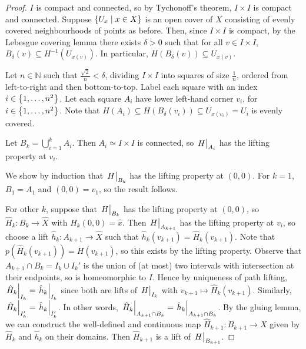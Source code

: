 \begin{proof}
	\( I \) is compact and connected, so by Tychonoff's theorem, \( I \times I \) is compact and connected.
	Suppose \( \qty{U_x \mid x \in X} \) is an open cover of \( X \) consisting of evenly covered neighbourhoods of points as before.
	Then, since \( I \times I \) is compact, by the Lebesgue covering lemma there exists \( \delta > 0 \) such that for all \( v \in I \times I \), \( B_\delta(v) \subseteq H^{-1}(U_{x(v)}) \).
	In particular, \( H(B_\delta(v)) \subseteq U_{x(v)} \).

	Let \( n \in \mathbb N \) such that \( \frac{\sqrt 2}{n} < \delta \), dividing \( I \times I \) into squares of size \( \frac 1n \), ordered from left-to-right and then bottom-to-top.
	Label each square with an index \( i \in \qty{1,\dots, n^2} \).
	Let each square \( A_i \) have lower left-hand corner \( v_i \), for \( i \in \qty{1,\dots,n^2} \).
	Note that \( H(A_i) \subseteq H(B_\delta(v_i)) \subseteq U_{x(v_i)} = U_i \) is evenly covered.

	Let \( B_k = \bigcup_{i=1}^k A_i \).
	Then \( A_i \simeq I \times I \) is connected, so \( \eval{H}_{A_i} \) has the lifting property at \( v_i \).

	We show by induction that \( \eval{H}_{B_k} \) has the lifting property at \( (0,0) \).
	For \( k = 1 \), \( B_1 = A_1 \) and \( (0,0) = v_1 \), so the result follows.

	For other \( k \), suppose that \( \eval{H}_{B_k} \) has the lifting property at \( (0,0) \), so \( \hat H_k \colon B_k \to \hat X \) with \( \hat H_k(0,0) = \hat x \).
	Then \( \eval{H}_{A_{k+1}} \) has the lifting property at \( v_i \), so choose a lift \( \hat h_k \colon A_{k+1} \to \hat X \) such that \( \hat h_k(v_{k+1}) = \hat H_k(v_{k+1}) \).
	Note that \( p(\hat H_k(v_{k+1})) = H(v_{k+1}) \), so this exists by the lifting property.
	Observe that \( A_{k+1} \cap B_k = I_k \cup I_k' \) is the union of (at most) two intervals with intersection at their endpoints, so is homeomorphic to \( I \).
	Hence by uniqueness of path lifting, \( \eval{\hat H_k}_{I_k} = \eval{\hat h_k}_{I_k} \) since both are lifts of \( \eval{H}_{I_k} \) with \( v_{k+1} \mapsto \hat H_k(v_{k+1}) \).
	Similarly, \( \eval{\hat H_k}_{I_k'} = \eval{\hat h_k}_{I_k'} \).
	In other words, \( \eval{\hat H_k}_{A_{k+1} \cap B_k} = \eval{\hat h_k}_{A_{k+1} \cap B_k} \).
	By the gluing lemma, we can construct the well-defined and continuous map \( \hat H_{k+1} \colon B_{k+1} \to X \) given by \( \hat H_k \) and \( \hat h_k \) on their domains.
	Then \( \hat H_{k+1} \) is a lift of \( \eval{H}_{B_{k+1}} \).
\end{proof}
